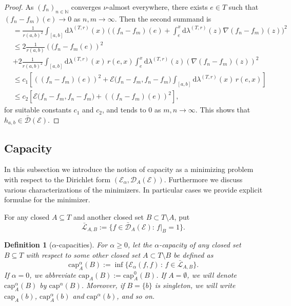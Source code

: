 \documentclass[11pt]{amsart}
\numberwithin{equation}{section}
\newtheorem{definition}{Definition}[section]
\begin{document}
{\begin{proof}
As $(f_{n})_{n\in\mathbb{N}}$ converges $\nu$-almost everywhere, there exists $e\in T$ such that $(f_{n} - f_{m}) (e) \rightarrow 0$ as $n,m  \rightarrow \infty$.  Then the second summand is
\begin{equation}
\begin{aligned}
 &=\tfrac{1}{r(a,b)^2}\int_{[a,b]}\mathrm{d}\lambda^{(T,r)}(x) \,\Big ( (f_{n} - f_{m}) (e) + \int_{e}^{x} \mathrm{d}\lambda^{(T,r)} (z) \nabla(f_{n}-f_m)(z) \Big)^2
 \\
&\leq 2 \tfrac{1}{r(a,b)}\left ( (f_{n} - f_{m} (e) \right )^{2}
 \\
&+  2\tfrac{1}{r(a,b)^2}\int_{[a,b]}\mathrm{d}\lambda^{(T,r)}(x) \, r(e,x) \int_{e}^{x} \mathrm{d}\lambda^{(T,r)} (z) \left (\nabla(f_{n}-f_m)(z)\right)^2
\\
&\leq  c_{1} \left [ \left ( (f_{n} - f_{m}) (e) \right )^{2} + {\mathcal E}\big(f_{n}-f_m,f_{n}-f_m\big) \int_{[a,b]}\mathrm{d}\lambda^{(T,r)}(x) \, r(e,x) \right ]\\
&\leq  c_{2} \left [ {\mathcal E}\big(f_{n}-f_m,f_{n}-f_m\big)   +  \left ( (f_{n} - f_{m}) (e) \right )^{2} \right ],
\end{aligned}
\end{equation}
{for suitable constants $c_1$ and $c_2$,}
and tends to $0$ as $m,n  \rightarrow \infty$.
This shows that $h_{{a},{b}}\in\bar{\mathcal D}({\mathcal E})$.
\end{proof}{\smallskip}

\subsection{Capacity}
\label{Sub:capacity}
In this subsection we introduce the notion of capacity as a minimizing problem with respect to the Dirichlet form $({\mathcal E}_\alpha,{\mathcal D}_A({\mathcal E}))$. Furthermore we discuss various characterizations of the minimizers. In particular cases we provide explicit formulae for the minimizer.

For any closed  $A\subseteq T$ and another closed set
{$B\subset T\setminus {A}$}, put
\begin{equation}\label{e:LAB}
   \bar{\mathcal L}_{A,{B}}
 :=
   \big\{f\in\bar{\mathcal D}_A(\mathcal E):\,f|_{B}=1\big\}.
\end{equation}
{\smallskip}

\begin{definition}[$\alpha$-capacities] For
$\alpha\ge 0$, let the {\rm $\alpha$-capacity} of any closed set ${B}\subseteq T$ with respect to
some other closed set {$A\subset T\setminus {B}$} be defined as
\begin{equation}\label{cap.1}
   \mathrm{cap}^{\alpha}_{A}({B})
 :=
   \inf\big\{\mathcal E_\alpha(f,f)\,:\,f\in\bar{\mathcal L}_{A,{B}}\big\}.
\end{equation}
\label{Def:02}
If $\alpha=0$, we abbreviate $\mathrm{cap}_{A}({B}):=\mathrm{cap}^0_{A}({B})$.
If $A=\emptyset$, we will denote $\mathrm{cap}^{\alpha}_{A}({B})$ by $\mathrm{cap}^{\alpha}({B})$.
{Moreover, if $B=\{b\}$ is singleton, we will write $\mathrm{cap}_{A}(b)$, $\mathrm{cap}^\alpha_{A}(b)$
and $\mathrm{cap}^\alpha(b)$, and so on.}
\end{definition}{\smallskip}

}
\end{document}
